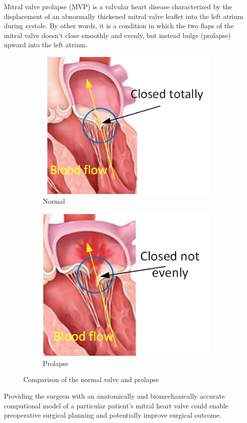 Mitral valve prolapse (MVP) is a valvular heart disease characterized by the
displacement of an abnormally thickened mitral valve leaflet into the left
atrium during systole. By other words, it is a condition in which the two flaps
of the mitral valve doesn't close smoothly and evenly, but instead bulge
(prolapse) upward into the left atrium.\cite{Hayek2005a}
\begin{figure}[H]\label{fig:compareMT}
  \centering
  \begin{subfigure}[H]{0.42\columnwidth}\label{fig:normalMT}
    \includegraphics[width=\columnwidth]{./fig/normalMT.png}
    \caption{Normal}
  \end{subfigure}
  \begin{subfigure}[H]{0.4\columnwidth}\label{fig:prolapseMT}
    \includegraphics[width=\columnwidth]{./fig/prolapseMT.png}
    \caption{Prolapse}
  \end{subfigure}
  \caption{Comparison of the normal valve and prolapse}
\end{figure}
Providing the surgeon with an anatomically and biomechanically accurate
computional model of a particular patient's mitral heart valve could enable
preoperative surgical planning and potentially improve surgical outcome.\par

